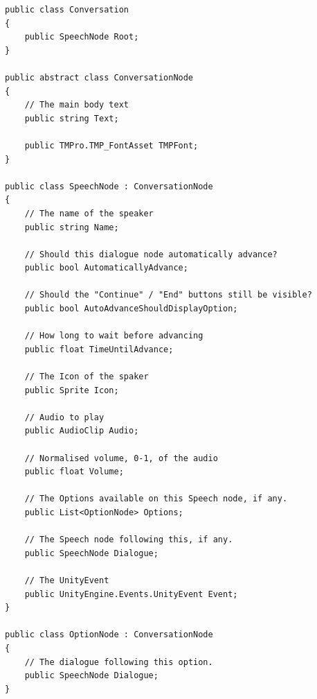 \documentclass[a4paper,12pt]{article}
\begin{document}
\begin{lstlisting}
public class Conversation
{
	public SpeechNode Root;
}

public abstract class ConversationNode
{
	// The main body text
	public string Text;
	
	public TMPro.TMP_FontAsset TMPFont;
}

public class SpeechNode : ConversationNode
{
	// The name of the speaker
	public string Name;
	
	// Should this dialogue node automatically advance?
	public bool AutomaticallyAdvance; 
	
	// Should the "Continue" / "End" buttons still be visible?
	public bool AutoAdvanceShouldDisplayOption; 
	
	// How long to wait before advancing
	public float TimeUntilAdvance; 
	
	// The Icon of the spaker
	public Sprite Icon;
	
	// Audio to play
	public AudioClip Audio;
	
	// Normalised volume, 0-1, of the audio
	public float Volume;
	
	// The Options available on this Speech node, if any.
	public List<OptionNode> Options;
	
	// The Speech node following this, if any.	
	public SpeechNode Dialogue; 
	
	// The UnityEvent
	public UnityEngine.Events.UnityEvent Event;
}

public class OptionNode : ConversationNode
{
	// The dialogue following this option.
	public SpeechNode Dialogue;
}
\end{lstlisting}


\newpage
\end{document}
